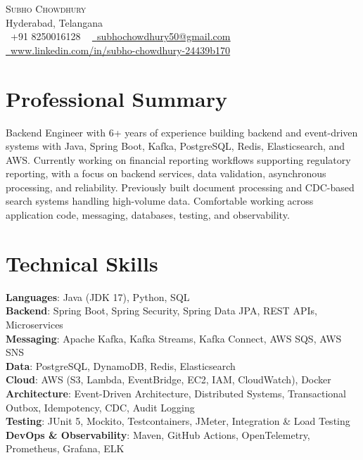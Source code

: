 \documentclass[letterpaper,11pt]{article}
\begin{document}
\begin{center}
    {\Huge \scshape Subho Chowdhury} \\ \vspace{1pt}
    Hyderabad, Telangana \\ \vspace{1pt}
    \small \raisebox{-0.1\height}\faPhone\ +91 8250016128 ~ \href{mailto:subhochowdhury50@gmail.com}{\raisebox{-0.2\height}\faEnvelope\  \underline{subhochowdhury50@gmail.com}} ~
    \href{https://linkedin.com/in/subho-chowdhury-24439b170}{\raisebox{-0.2\height}\faLinkedin\ \underline{www.linkedin.com/in/subho-chowdhury-24439b170}} ~
\end{center}
\section{Professional Summary}
    Backend Engineer with 6+ years of experience building backend and event-driven systems with Java, Spring Boot, Kafka, PostgreSQL, Redis, Elasticsearch, and AWS. Currently working on financial reporting workflows supporting regulatory reporting, with a focus on backend services, data validation, asynchronous processing, and reliability. Previously built document processing and CDC-based search systems handling high-volume data. Comfortable working across application code, messaging, databases, testing, and observability.
\section{Technical Skills}
 \begin{itemize}[leftmargin=0.15in, label={}]
    \small{\item{
     \textbf{Languages}{: Java (JDK 17), Python, SQL} \\
     \textbf{Backend}{: Spring Boot, Spring Security, Spring Data JPA, REST APIs, Microservices} \\
     \textbf{Messaging}{: Apache Kafka, Kafka Streams, Kafka Connect, AWS SQS, AWS SNS} \\
     \textbf{Data}{: PostgreSQL, DynamoDB, Redis, Elasticsearch} \\
     \textbf{Cloud}{: AWS (S3, Lambda, EventBridge, EC2, IAM, CloudWatch), Docker} \\
     \textbf{Architecture}{: Event-Driven Architecture, Distributed Systems, Transactional Outbox, Idempotency, CDC, Audit Logging} \\
     \textbf{Testing}{: JUnit 5, Mockito, Testcontainers, JMeter, Integration \& Load Testing} \\
     \textbf{DevOps \& Observability}{: Maven, GitHub Actions, OpenTelemetry, Prometheus, Grafana, ELK} \\
    }}
 \end{itemize}
 
\end{document}
